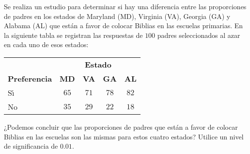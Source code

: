 \begin{enunciado}
 Se realiza un estudio para determinar si hay una diferencia
 entre las proporciones de padres en los estados
 de Maryland (MD), Virginia (VA), Georgia (GA) y Alabama (AL)
 que est\'an a favor de colocar Biblias en las escuelas primarias.
 En la siguiente tabla se registran las respuestas de $100$ padres
 seleccionados al azar en cada uno de esos estados:
 \begin{center}
  \begin{tabular}{lcccc}
   & \multicolumn{4}{c}{\textbf{Estado}} \\
   \cline{2-5}
   \textbf{Preferencia} & \textbf{MD} & \textbf{VA} & \textbf{GA} &
   \textbf{AL} \\
   \hline 
   S\'{\i} & $65$ & $71$ & $78$ & $82$ \\
   No & $35$ & $29$ & $22$ & $18$
  \end{tabular}
 \end{center}
 ¿Podemos concluir que las proporciones de padres que est\'an a favor
 de colocar Biblias en las escuelas son las mismas
 para estos cuatro estados?
 Utilice un nivel de significancia de $0.01$.
\end{enunciado}

